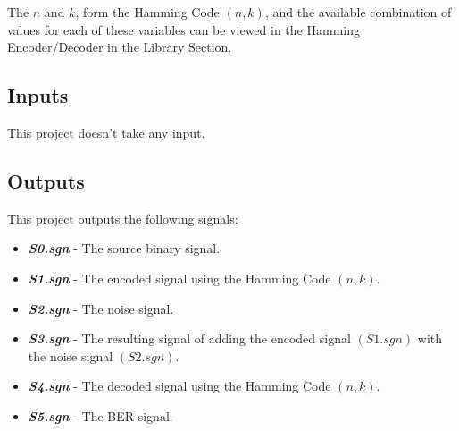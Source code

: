 \begin{refsection}
The $n$ and $k$, form the Hamming Code $(n, k)$, and the available combination of values for each of these variables can be viewed in the Hamming Encoder/Decoder in the Library Section.

\subsection*{Inputs}

This project doesn't take any input.

\subsection*{Outputs}

This project outputs the following signals:

\begin{itemize}
	\item \textbf{\textit{S0.sgn}} - The source binary signal.
	\item \textbf{\textit{S1.sgn}} - The encoded signal using the Hamming Code $(n, k)$.
	\item \textbf{\textit{S2.sgn}} - The noise signal.
	\item \textbf{\textit{S3.sgn}} - The resulting signal of adding the encoded signal $(S1.sgn)$ with the noise signal $(S2.sgn)$.
	\item \textbf{\textit{S4.sgn}} - The decoded signal using the Hamming Code $(n, k)$.
	\item \textbf{\textit{S5.sgn}} - The BER signal.
\end{itemize}

\clearpage
\printbibliography[heading=subbibliography]
\end{refsection}
\cleardoublepage

